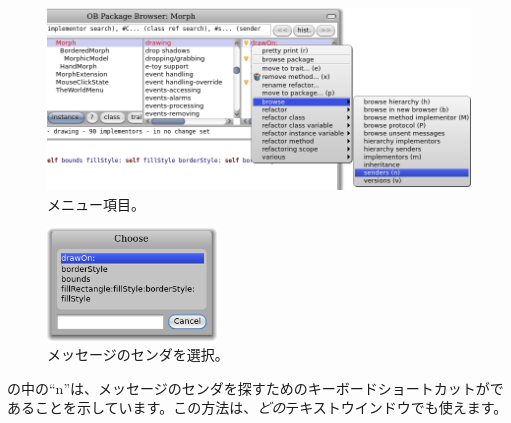 \documentclass[a4paper,10pt,twoside]{book}
\begin{document}
\begin{figure}[htb]
\centerline {\includegraphics[width=\textwidth]{SendersOfDrawOn}}
\caption{メニュー項目。}
\end{figure}

\begin{figure}[htb]
\centerline {\includegraphics[width=0.4\textwidth]{SendersOfDrawOn2}}
\caption{メッセージのセンダを選択。}
\end{figure}

の中の``n''は、メッセージのセンダを探すためのキーボードショートカットがであることを示しています。この方法は、\emph{どの}テキストウインドウでも使えます。

\end{document}
